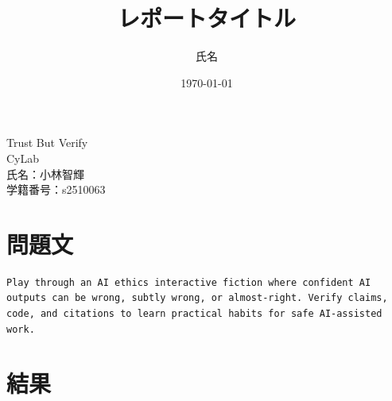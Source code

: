 \documentclass[a4paper,11pt,lualatex,ja=standard]{bxjsarticle}
\newcommand{\cover}[3]{
  \thispagestyle{empty}
  \vspace*{4cm}
  \begin{center}
    {\LARGE #1}\\[2cm]
    {\Large #2}\\[3cm]
    {\large 氏名：#3}\\[1cm]
    {\large 学籍番号：s2510063}
  \end{center}
  \newpage
}
\begin{document}
\cover{Trust But Verify}{CyLab}{小林智輝}

\title{レポートタイトル}
\author{氏名}
\date{\today}

\section{問題文}
\begin{verbatim}
Play through an AI ethics interactive fiction where confident AI outputs can be wrong, subtly wrong, or almost-right. Verify claims, code, and citations to learn practical habits for safe AI-assisted work.
\end{verbatim}

\section{結果}
\end{document}
